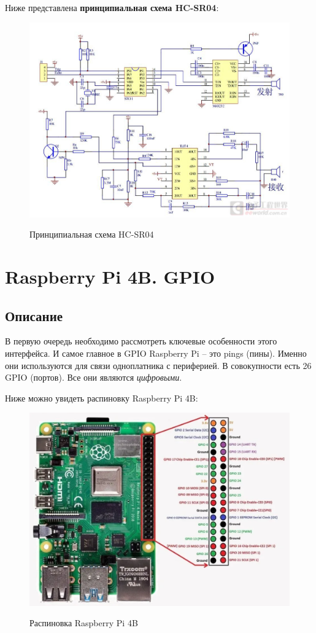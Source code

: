 \documentclass[a4paper, 14pt]{article}
\begin{document}
Ниже представлена \textbf{принципиальная схема HC-SR04}:

\begin{figure}[H]
	\centering
	\includegraphics[width=15cm]{screenshots/13.png}\\
	\caption{Принципиальная схема HC-SR04}
\end{figure}

\newpage
\section{Raspberry Pi 4B. GPIO}

\subsection{Описание}

В первую очередь необходимо рассмотреть ключевые особенности этого интерфейса. И самое главное в GPIO Raspberry Pi – это pings (пины). Именно они используются для связи одноплатника с периферией.
В совокупности есть 26 GPIO (портов). Все они являются \textit{цифровыми}.

Ниже можно увидеть распиновку Raspberry Pi 4B:

\begin{figure}[H]
	\centering
	\includegraphics[width=12cm]{screenshots/14.png}\\
	\caption{Распиновка Raspberry Pi 4B}
\end{figure}
\end{document}

